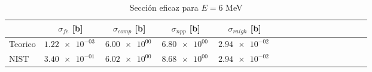 \begin{table}
\caption{Sección eficaz para $E=6$ MeV}
\begin{tabular}{lccccccccccccccc}
\toprule
 & $\sigma_{fe}$ [b] & $\sigma_{comp}$ [b] & $\sigma_{npp}$ [b] & $\sigma_{raigh}$ [b] \\
\midrule
Teorico & $\SI{1.22e-03}{}$ & $\SI{6.00e+00}{}$ & $\SI{6.80e+00}{}$ & $\SI{2.94e-02}{}$ \\
NIST & $\SI{3.40e-01}{}$ & $\SI{6.02e+00}{}$ & $\SI{8.68e+00}{}$ & $\SI{2.94e-02}{}$ \\
\bottomrule
\end{tabular}
\end{table}
